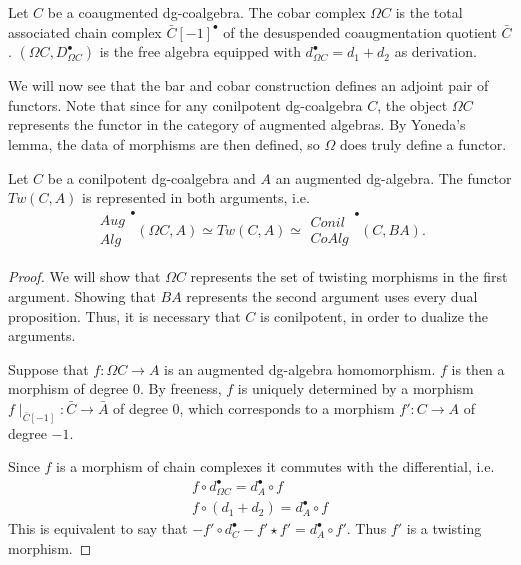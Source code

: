 \documentclass[../thesis.tex]{subfiles}
\begin{document}
            \begin{proposition}
                Let $C$ be a coaugmented dg-coalgebra. The cobar complex $\Omega C$ is the total associated chain complex $\bar{C}[-1]^\bullet$ of the desuspended coaugmentation quotient $\bar{C}$. $(\Omega C, D_{\Omega C}^\bullet)$ is the free algebra equipped with $d_{\Omega C}^\bullet = d_1 + d_2$ as derivation.
            \end{proposition}

            We will now see that the bar and cobar construction defines an adjoint pair of functors. Note that since for any conilpotent dg-coalgebra $C$, the object $\Omega C$ represents the functor in the category of augmented algebras. By Yoneda's lemma, the data of morphisms are then defined, so $\Omega$ does truly define a functor.

            \begin{thm}
                Let $C$ be a conilpotent dg-coalgebra and $A$ an augmented dg-algebra. The functor $Tw(C,A)$ is represented in both arguments, i.e.
                \begin{align*}
                    \substack{Aug \\ Alg}^\bullet(\Omega C, A)\simeq Tw(C, A) \simeq\substack{Conil \\ CoAlg}^\bullet(C, BA)\text{.}
                \end{align*}
            \end{thm}

            \begin{proof}
                We will show that $\Omega C$ represents the set of twisting morphisms in the first argument. Showing that $BA$ represents the second argument uses every dual proposition. Thus, it is necessary that $C$ is conilpotent, in order to dualize the arguments.

                Suppose that $f:\Omega C \rightarrow A$ is an augmented dg-algebra homomorphism. $f$ is then a morphism of degree $0$. By freeness, $f$ is uniquely determined by a morphism $f\mid_{\bar{C}[-1]}:\bar{C}\rightarrow \bar{A}$ of degree $0$, which corresponds to a morphism $f':C\rightarrow A$ of degree $-1$. 

                Since $f$ is a morphism of chain complexes it commutes with the differential, i.e. 
                \begin{align*}
                    f\circ d_{\Omega C}^\bullet = d_A^\bullet\circ f \\
                    f\circ (d_1 + d_2) = d_A^\bullet\circ f 
                \end{align*}
                This is equivalent to say that $-f'\circ d_C^\bullet - f'\star f' = d_A^\bullet\circ f'$. Thus $f'$ is a twisting morphism.
            \end{proof}
\end{document}
